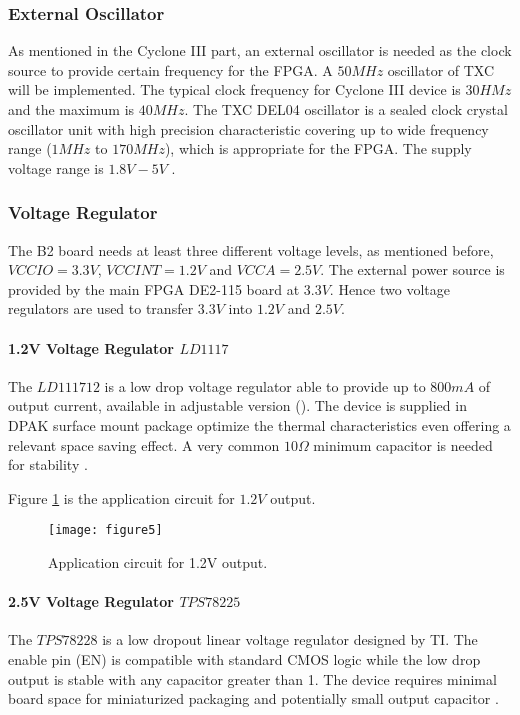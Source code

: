 \subsubsection{External Oscillator}

As mentioned in the Cyclone III part, an external oscillator is needed as the clock source to provide certain frequency for the FPGA. A $50MHz$ oscillator of TXC will be implemented. The typical clock frequency for Cyclone III device is $30HMz$ and the maximum is $40MHz$. The TXC DEL04 oscillator is a sealed clock crystal oscillator unit with high precision characteristic covering up to wide frequency range ($1MHz$ to $170 MHz$), which is appropriate for the FPGA. The supply voltage range is $1.8V-5V$ \citep{TXC:osc_datasheet}.


\subsubsection{Voltage Regulator}

The B2 board needs at least three different voltage levels, as mentioned before, $VCCIO=3.3V$, $VCCINT= 1.2V$ and $VCCA=2.5V$. The external power source is provided by the main FPGA DE2-115 board at $3.3V$. Hence two voltage regulators are used to transfer $3.3V$ into $1.2V$ and $2.5V$.

\paragraph{1.2V Voltage Regulator \texorpdfstring{$LD1117$}{LD1117}}
The $LD111712$ is a low drop voltage regulator able to provide up to $800mA$ of output current, available in adjustable version (). The device is supplied in DPAK surface mount package optimize the thermal characteristics even offering a relevant space saving effect. A very common $10\Omega$ minimum capacitor is needed for stability \citep{STMicro:2012:LD1117xx}.

Figure \ref{fig:b2_f5} is the application circuit for $1.2V$ output.

\begin{figure}
 \centering
 \texttt{[image: figure5]}
 \caption{Application circuit for 1.2V output.}
 \label{fig:b2_f5}
\end{figure}



\paragraph{2.5V Voltage Regulator \texorpdfstring{$TPS78225$}{TPS78225}}
The $TPS78228$ is a low dropout linear voltage regulator designed by TI. The enable pin (EN) is compatible with standard CMOS logic while the low drop output is stable with any capacitor greater than 1. The device requires minimal board space for miniaturized packaging and potentially small output capacitor \citep{TI:2008:TPS782}.

